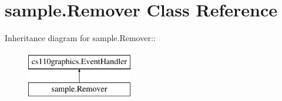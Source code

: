 \hypertarget{classsample_1_1Remover}{
\section{sample.Remover Class Reference}
\label{classsample_1_1Remover}
}
Inheritance diagram for sample.Remover::\begin{figure}[H]
\begin{center}
\leavevmode
\includegraphics[height=2cm]{classsample_1_1Remover}
\end{center}
\end{figure}
